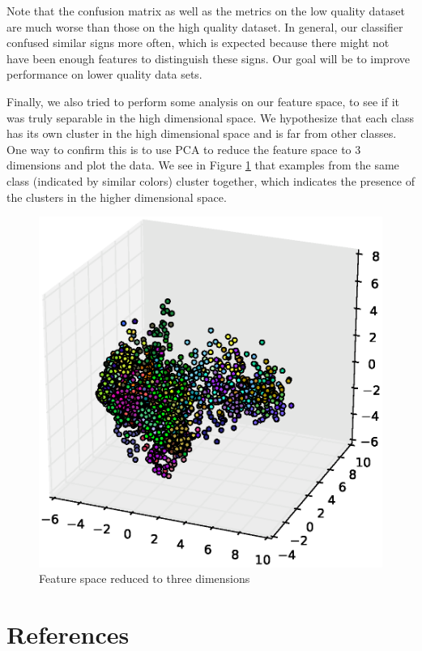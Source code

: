 \documentclass[twocolumn]{article}
\begin{document}
Note that the confusion matrix as well as the metrics on the low quality dataset are much worse than those on the high quality dataset. In general, our classifier confused similar signs more often, which is expected because there might not have been enough features to distinguish these signs. Our goal will be to improve performance on lower quality data sets.

Finally, we also tried to perform some analysis on our feature space, to see if it was truly separable in the high dimensional space. We hypothesize that each class has its own cluster in the high dimensional space and is far from other classes. One way to confirm this is to use PCA to reduce the feature space to 3 dimensions and plot the data. We see in Figure \ref{fig:feature_space} that examples from the same class (indicated by similar colors) cluster together, which indicates the presence of the clusters in the higher dimensional space. 

\begin{figure}[h]
    \centering
    \includegraphics[trim=100 40 80 80, clip, width=0.8\linewidth]{results/feature_space}
    \caption{Feature space reduced to three dimensions}
    \label{fig:feature_space}
\end{figure}

\section{References}
\printbibliography[heading=none]
\end{document}
